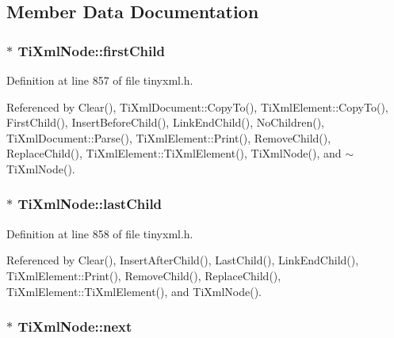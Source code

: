 \subsection{Member Data Documentation}
\hypertarget{class_ti_xml_node_af749fb7f22010b80e8f904c32653d50e}{
\subsubsection[{firstChild}]{$\ast$ {\bf TiXmlNode::firstChild}}}
\label{class_ti_xml_node_af749fb7f22010b80e8f904c32653d50e}


Definition at line 857 of file tinyxml.h.

Referenced by Clear(), TiXmlDocument::CopyTo(), TiXmlElement::CopyTo(), FirstChild(), InsertBeforeChild(), LinkEndChild(), NoChildren(), TiXmlDocument::Parse(), TiXmlElement::Print(), RemoveChild(), ReplaceChild(), TiXmlElement::TiXmlElement(), TiXmlNode(), and $\sim$TiXmlNode().\hypertarget{class_ti_xml_node_a5b30756d21b304580d22a841ec9d61f8}{
\subsubsection[{lastChild}]{$\ast$ {\bf TiXmlNode::lastChild}}}
\label{class_ti_xml_node_a5b30756d21b304580d22a841ec9d61f8}


Definition at line 858 of file tinyxml.h.

Referenced by Clear(), InsertAfterChild(), LastChild(), LinkEndChild(), TiXmlElement::Print(), RemoveChild(), ReplaceChild(), TiXmlElement::TiXmlElement(), and TiXmlNode().\hypertarget{class_ti_xml_node_a2f329cc993d2d34df76e17dcbb776b45}{
\subsubsection[{next}]{$\ast$ {\bf TiXmlNode::next}}}
\label{class_ti_xml_node_a2f329cc993d2d34df76e17dcbb776b45}


